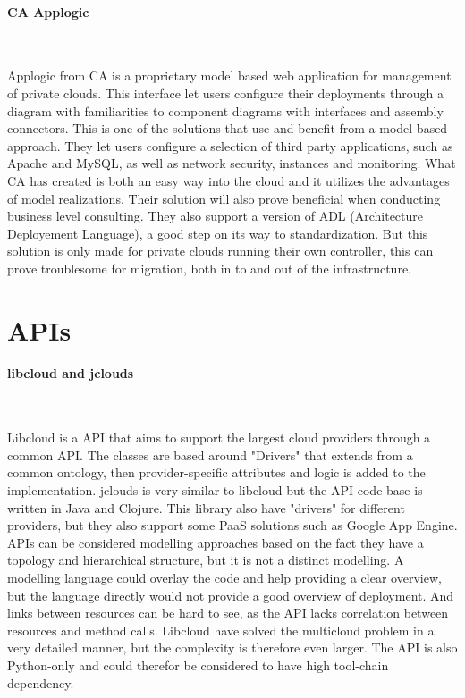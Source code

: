 \paragraph{CA Applogic}~\cite{applogic}

Applogic from CA is a proprietary model based web application for management of private clouds. 
This interface let users configure their deployments through a diagram with familiarities to component diagrams with interfaces and assembly connectors. 
This is one of the solutions that use and benefit from a model based approach. They let users configure a selection of third party applications, 
such as Apache and MySQL, as well as network security, instances and monitoring. 
What CA has created is both an easy way into the cloud and it utilizes the advantages of model realizations. 
Their solution will also prove beneficial when conducting business level consulting. 
They also support a version of ADL (Architecture Deployement Language), a good step on its way to standardization. 
But this solution is only made for private clouds running their own controller, this can prove troublesome for migration, both in to and out of the infrastructure.

\section{APIs}

\paragraph{libcloud and jclouds}~\cite{libcloud, jclouds}

Libcloud is a API that aims to support the largest cloud providers through a common API. 
The classes are based around "Drivers" that extends from a common ontology, then provider-specific attributes and logic is added to the implementation.
jclouds is very similar to libcloud but the API code base is written in Java and Clojure. 
This library also have "drivers" for different providers, but they also support some PaaS solutions such as Google App Engine.
APIs can be considered modelling approaches based on the fact they have a topology and hierarchical structure, 
but it is not a distinct modelling. A modelling language could overlay the code and help providing a clear overview, 
but the language directly would not provide a good overview of deployment. 
And links between resources can be hard to see, as the API lacks correlation between resources and method calls. 
Libcloud have solved the multicloud problem in a very detailed manner, but the complexity is therefore even larger. 
The API is also Python-only and could therefor be considered to have high tool-chain dependency.

